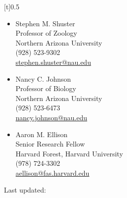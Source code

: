 \documentclass[]{article}
\begin{document}
{[}t{]}{0.5}

\begin{itemize}
\item
  Stephen M. Shuster\\ Professor of Zoology\\ Northern Arizona
  University\\(928)
  523-9302\\\href{mailto:stephen.shuster@nau.edu}{stephen.shuster@nau.edu}
\item
  Nancy C. Johnson\\ Professor of Biology\\ Northern Arizona
  University\\(928)
  523-6473\\\href{mailto:nancy.johnson@nau.edu}{nancy.johnson@nau.edu}
\item
  Aaron M. Ellison\\ Senior Research Fellow\\ Harvard Forest, Harvard
  University\\(978)
  724-3302\\\href{mailto:aellison@fas.harvard.edu}{aellison@fas.harvard.edu}
\end{itemize}

Last updated:\\
\end{document}
